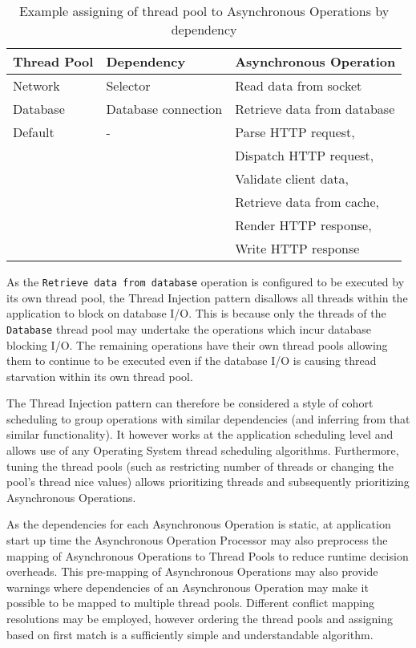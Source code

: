 \documentclass{article}
\begin{document}
\begin{table}[!t]
\renewcommand{\arraystretch}{1.3}
\caption{Example assigning of thread pool to Asynchronous Operations by dependency}
\label{tab:example_request_thread_pools}
\centering
\begin{tabular}{l||l||l}
\hline
\bfseries Thread Pool & \bfseries Dependency & \bfseries Asynchronous Operation \\
\hline\hline
Network & Selector & Read data from socket \\
\hline
Database & Database connection & Retrieve data from database \\
\hline
Default & - & Parse HTTP request, \\
& & Dispatch HTTP request, \\
& & Validate client data, \\ 
& & Retrieve data from cache, \\
& & Render HTTP response, \\
& & Write HTTP response \\
\hline
\end{tabular}
\end{table}

As the \texttt{Retrieve data from database} operation is configured to be
executed by its own thread pool, the Thread Injection pattern disallows all
threads within the application to block on database I/O.  This is because only
the threads of the \texttt{Database} thread pool may undertake the operations
which incur database blocking I/O.  The remaining operations have their own
thread pools allowing them to continue to be executed even if the database I/O
is causing thread starvation within its own thread pool.

The Thread Injection pattern can therefore be considered a style of cohort
scheduling \cite{cohort} to group operations with similar dependencies (and
inferring from that similar functionality).  It however works at the application
scheduling level and allows use of any Operating System thread scheduling
algorithms.  Furthermore, tuning the thread pools (such as restricting number of
threads or changing the pool's thread nice values) allows prioritizing threads and
subsequently prioritizing Asynchronous Operations.

As the dependencies for each Asynchronous Operation is static, at application
start up time the Asynchronous Operation Processor may also preprocess the
mapping of Asynchronous Operations to Thread Pools to reduce runtime decision
overheads.  This pre-mapping of Asynchronous Operations may also provide
warnings where dependencies of an Asynchronous Operation may make it possible to
be mapped to multiple thread pools.  Different conflict mapping resolutions may
be employed, however ordering the thread pools and assigning based on first
match is a sufficiently simple and understandable algorithm.
\end{document}
